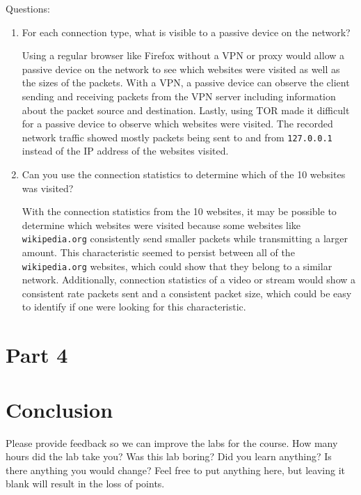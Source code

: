 \documentclass[11pt]{article}
\begin{document}
Questions:
\begin{enumerate}
  \item For each connection type, what is visible to a passive device on the network?

  Using a regular browser like Firefox without a VPN or proxy would allow a passive device on the network to
  see which websites were visited as well as the sizes of the packets. With a VPN, a passive device can
  observe the client sending and receiving packets from the VPN server including information about the packet source and destination.
  Lastly, using TOR made it difficult for a passive device to observe which websites were visited.
  The recorded network traffic showed mostly packets being sent to and from \verb|127.0.0.1|
  instead of the IP address of the websites visited.

  \item Can you use the connection statistics to determine which of the 10 websites was visited?

  With the connection statistics from the 10 websites, it may be possible to determine which websites were visited
  because some websites like \verb|wikipedia.org| consistently send smaller packets while transmitting a larger amount.
  This characteristic seemed to persist between all of the \verb|wikipedia.org| websites, which could show that they belong to a similar network.
  Additionally, connection statistics of a video or stream would show a consistent rate packets sent and a consistent packet
  size, which could be easy to identify if one were looking for this characteristic.
\end{enumerate}

\newpage
\section*{Part 4}
\label{sec:part-4}


\section*{Conclusion}
\label{sec:conclusion}
Please provide feedback so we can improve the labs for the course. How many
hours did the lab take you? Was this lab boring? Did you learn anything? Is
there anything you would change? Feel free to put anything here, but leaving it
blank will result in the loss of points.

\nocite{*}


\end{document}
